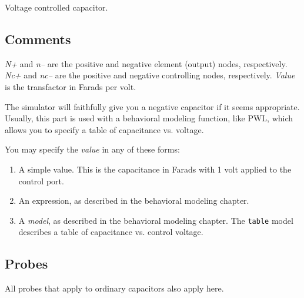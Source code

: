 Voltage controlled capacitor.
\subsection{Comments}

{\it N+} and {\it n--} are the positive and negative element (output) nodes,
respectively.  {\it Nc+} and {\it nc--} are the positive and negative
controlling nodes, respectively.  {\it Value} is the transfactor in
Farads per volt.

The simulator will faithfully give you a negative capacitor if it
seems appropriate.  Usually, this part is used with a behavioral
modeling function, like PWL, which allows you to specify a table of
capacitance vs. voltage.

You may specify the {\it value} in any of these forms:

\begin{enumerate}
  
\item
A simple value.  This is the capacitance in Farads with 1 volt applied
to the control port.
  
\item
An expression, as described in the behavioral modeling chapter.

\item
A {\it model}, as described in the behavioral modeling chapter.  The
{\tt table} model describes a table of capacitance vs. control voltage.

\end{enumerate}
\subsection{Probes}

All probes that apply to ordinary capacitors also apply here.
